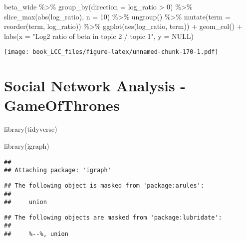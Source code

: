 \documentclass[
]{book}
\newenvironment{Shaded}{\begin{snugshade}}{\end{snugshade}}
\newcommand{\AttributeTok}[1]{\textcolor[rgb]{0.77,0.63,0.00}{#1}}
\newcommand{\ConstantTok}[1]{\textcolor[rgb]{0.00,0.00,0.00}{#1}}
\newcommand{\DecValTok}[1]{\textcolor[rgb]{0.00,0.00,0.81}{#1}}
\newcommand{\FunctionTok}[1]{\textcolor[rgb]{0.00,0.00,0.00}{#1}}
\newcommand{\NormalTok}[1]{#1}
\newcommand{\SpecialCharTok}[1]{\textcolor[rgb]{0.00,0.00,0.00}{#1}}
\newcommand{\StringTok}[1]{\textcolor[rgb]{0.31,0.60,0.02}{#1}}
\begin{document}
\begin{Shaded}
\begin{Highlighting}[]
\NormalTok{beta\_wide }\SpecialCharTok{\%\textgreater{}\%}
  \FunctionTok{group\_by}\NormalTok{(}\AttributeTok{direction =}\NormalTok{ log\_ratio }\SpecialCharTok{\textgreater{}} \DecValTok{0}\NormalTok{) }\SpecialCharTok{\%\textgreater{}\%}
  \FunctionTok{slice\_max}\NormalTok{(}\FunctionTok{abs}\NormalTok{(log\_ratio), }\AttributeTok{n =} \DecValTok{10}\NormalTok{) }\SpecialCharTok{\%\textgreater{}\%} 
  \FunctionTok{ungroup}\NormalTok{() }\SpecialCharTok{\%\textgreater{}\%}
  \FunctionTok{mutate}\NormalTok{(}\AttributeTok{term =} \FunctionTok{reorder}\NormalTok{(term, log\_ratio)) }\SpecialCharTok{\%\textgreater{}\%}
  \FunctionTok{ggplot}\NormalTok{(}\FunctionTok{aes}\NormalTok{(log\_ratio, term)) }\SpecialCharTok{+}
  \FunctionTok{geom\_col}\NormalTok{() }\SpecialCharTok{+}
  \FunctionTok{labs}\NormalTok{(}\AttributeTok{x =} \StringTok{"Log2 ratio of beta in topic 2 / topic 1"}\NormalTok{, }\AttributeTok{y =} \ConstantTok{NULL}\NormalTok{)}
\end{Highlighting}
\end{Shaded}

\texttt{[image: book\_LCC\_files/figure-latex/unnamed-chunk-170-1.pdf]}

\hypertarget{social-network-analysis---gameofthrones}{%
\chapter{Social Network Analysis - GameOfThrones}\label{social-network-analysis---gameofthrones}}

\begin{Shaded}
\begin{Highlighting}[]
\FunctionTok{library}\NormalTok{(tidyverse)}

\FunctionTok{library}\NormalTok{(igraph)}
\end{Highlighting}
\end{Shaded}

\begin{verbatim}
## 
## Attaching package: 'igraph'
\end{verbatim}

\begin{verbatim}
## The following object is masked from 'package:arules':
## 
##     union
\end{verbatim}

\begin{verbatim}
## The following objects are masked from 'package:lubridate':
## 
##     %--%, union
\end{verbatim}
\end{document}
